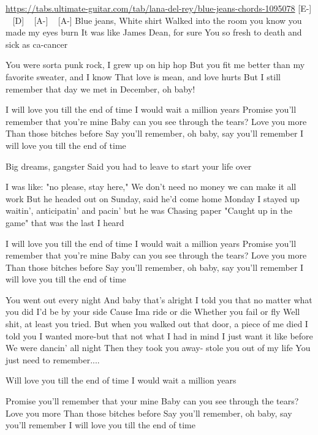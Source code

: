 
\begin{guitar}
\url{https://tabs.ultimate-guitar.com/tab/lana-del-rey/blue-jeans-chords-1095078}
[E-] ~ [D] ~ [A-] ~ [A-]
Blue jeans, White shirt
Walked into the room you know you made my eyes burn
It was like James Dean, for sure
You so fresh to death and sick as ca-cancer

You were sorta punk rock, I grew up on hip hop
But you fit me better than my favorite sweater, and I know
That love is mean, and love hurts
But I still remember that day we met in December, oh baby!

I will love you till the end of time
I would wait a million years
Promise you'll remember that you're mine
Baby can you see through the tears?
Love you more
Than those bitches before
Say you'll remember, oh baby, say you'll remember
I will love you till the end of time

Big dreams, gangster
Said you had to leave to start your life over

I was like: "no please, stay here,"
We don't need no money we can make it all work
But he headed out on Sunday, said he'd come home Monday
I stayed up waitin', anticipatin' and pacin' but he was
Chasing paper
"Caught up in the game" that was the last I heard

I will love you till the end of time
I would wait a million years
Promise you'll remember that you're mine
Baby can you see through the tears?
Love you more
Than those bitches before
Say you'll remember, oh baby, say you'll remember
I will love you till the end of time


You went out every night
And baby that's alright
I told you that no matter what you did I'd be by your side
Cause Ima ride or die
Whether you fail or fly
Well shit, at least you tried.
But when you walked out that door, a piece of me died
I told you I wanted more-but that not what I had in mind
I just want it like before
We were dancin' all night
Then they took you away- stole you out of my life
You just need to remember....

Will love you till the end of time
I would wait a million years

Promise you'll remember that your mine
Baby can you see through the tears?
Love you more
Than those bitches before
Say you'll remember, oh baby, say you'll remember
I will love you till the end of time 
\end{guitar}